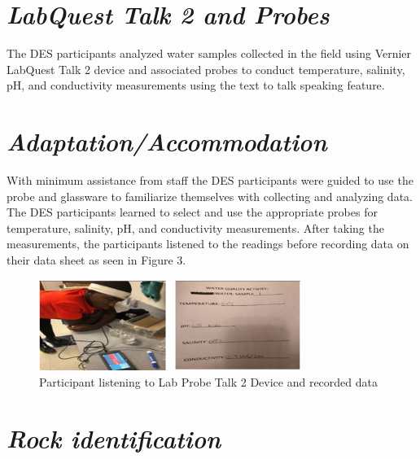 \documentclass[11.5pt]{sig-alternate}
\begin{document}
\begin{large}
\section*{\textit{LabQuest Talk 2 and Probes}}
 
The DES participants analyzed water samples collected in the field using Vernier LabQuest Talk 2  device and associated probes to conduct temperature, salinity, pH, and conductivity measurements using the text to talk speaking feature. 

\section*{\textit{Adaptation/Accommodation}}

With minimum assistance from staff the DES participants were guided to use the probe and glassware to familiarize themselves with collecting and analyzing data. The DES participants learned to select and use the appropriate probes for temperature, salinity, pH, and conductivity measurements.  After taking the measurements, the participants listened to the readings before recording data on their data sheet as seen in Figure 3.
{\begin{figure}[htp] 
    \centering
    \includegraphics[width=8.5cm]{figure3.png}
    \caption{Participant listening to Lab Probe Talk 2 Device and recorded data }
    \label{Lab Probe Talk 2 Device and recorded data }
\end{figure}
}

\section*{\textit{Rock identification}}


\end{large}
\end{document}
